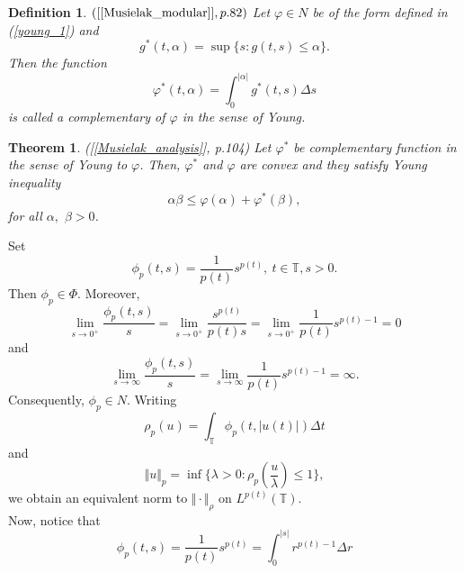 \documentclass[12pt,a4paper,oneside,titlepage]{article}
\newtheorem{Twierdzenie}{Theorem}
\newtheorem{Def}{Definition}
\begin{document}
\begin{Def}$([\ref{Musielak_modular}], p.82)$ Let $\varphi \in N$ be of the form defined in (\ref{young_1}) and 
\begin{equation}
g^{*}(t,\alpha)=\sup \lbrace s : g(t, s) \leq \alpha \rbrace .
\end{equation}
 Then the function
\begin{equation}
\varphi^*(t,\alpha) = \int_{0}^{\vert \alpha \vert} g^*(t,s)\Delta s
\end{equation}
is called a complementary of $\varphi$ in the sense of Young.
\end{Def}

\begin{Twierdzenie}([\ref{Musielak_analysis}], p.104) Let  $\varphi^*$ be complementary function in the sense of Young to $\varphi$. Then, $\varphi^*$ and $\varphi$ are convex and they satisfy Young inequality
\begin{equation}
\label{young_inequality}
\alpha \beta \leq \varphi (\alpha) +\varphi^* (\beta),
\end{equation}
for all $\alpha, $ $\beta>0$.
\end{Twierdzenie}
\bigskip
\indent
Set
\begin{equation}
\phi_{p}(t,s)= \frac{1}{p(t)} s^{p(t)}, ~t \in \mathbb{T}, s>0.
\end{equation}
Then $\phi_p \in \Phi$. Moreover,
\begin{equation}
\nonumber
\lim_{s \rightarrow 0^+} \frac{\phi_p (t,s)}{s}= \lim_{s \rightarrow 0^+} \frac{s^{p(t)}}{p(t) s}= \lim_{s \rightarrow 0^+} \frac{1}{p(t)} s^{p(t)-1}=0
\end{equation} 
and
\begin{equation}
\nonumber
\lim_{s \rightarrow \infty} \frac{\phi_p (t,s)}{s} = \lim_{s \rightarrow \infty} \frac{1}{p(t)} s^{p(t)-1} = \infty.
\end{equation}
Consequently, $\phi_p \in N$. 
Writing 
\begin{equation}
\rho_{p}(u) = \int_{\mathbb{T}} \phi_p (t, \vert u(t) \vert ) \Delta t
\end{equation}
and 
\begin{equation}
\label{nowa_norma}
\Vert u \Vert_{p} =  \inf  \lbrace \lambda > 0 : \rho_{p} \left( \frac{u}{\lambda}  \right) \leq 1 \rbrace,
\end{equation}
we obtain an equivalent norm to $\Vert \cdot \Vert_{\rho}$ on $L^{p(t)}(\mathbb{T})$. \\
\indent
Now, notice that
\begin{equation}
\nonumber
\phi_{p}(t,s) = \frac{1}{p(t)} s^{p(t)} = \int_{0}^{\vert s \vert} r^{p(t)-1} \Delta r
\end{equation}
\end{document}
